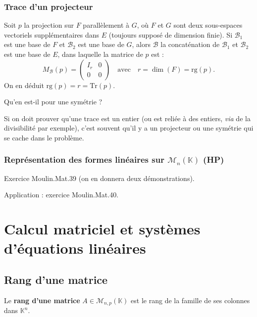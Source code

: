 \documentclass[french]{article}
\newcommand{\K}{\mathbb{K}}
\newcommand{\Tr}{\text{Tr}}
\newcommand{\rg}{\text{rg}}
\theoremstyle{plain}
\theoremstyle{definition}
\theoremstyle{remark}
\begin{document}
\subsubsection*{Trace d'un projecteur}

Soit $p$ la projection sur $F$ parallèlement à $G$, où $F$ et $G$ sont deux sous-espaces vectoriels supplémentaires dans $E$ (toujours supposé de dimension finie). Si $\mathcal{B}_1$ est une base de $F$ et $\mathcal{B}_2$ est une base de $G$, alors $\mathcal{B}$ la concaténation de $\mathcal{B}_1$ et $\mathcal{B}_2$ est une base de $E$, dans laquelle la matrice de $p$ est :
$$M_\mathcal{B}(p)=\begin{pmatrix}
	I_r&0\\
	0&0
\end{pmatrix}\quad\text{avec}\quad r=\dim(F)=\rg(p).$$
On en déduit $\rg(p)=r=\Tr(p)$.

\begin{exo}
	Qu'en est-il pour une symétrie ?
\end{exo}

\begin{met}
	Si on doit prouver qu'une trace est un entier (ou est reliée à des entiers, \textit{via} de la divisibilité par exemple), c'est souvent qu'il y a un projecteur ou une symétrie qui se cache dans le problème.
\end{met}

\subsubsection*{Représentation des formes linéaires sur $\mathcal{M}_n(\K)$ (HP)}

Exercice Moulin.Mat.39 (on en donnera deux démonstrations).

Application : exercice Moulin.Mat.40.

\section{Calcul matriciel et systèmes d'équations linéaires}

\subsection{Rang d'une matrice}

\begin{dfn}
	Le \textbf{rang d'une matrice} $A\in\mathcal{M}_{n,p}(\K)$ est le rang de la famille de ses colonnes dans $\K^n$.
\end{dfn}
\end{document}
